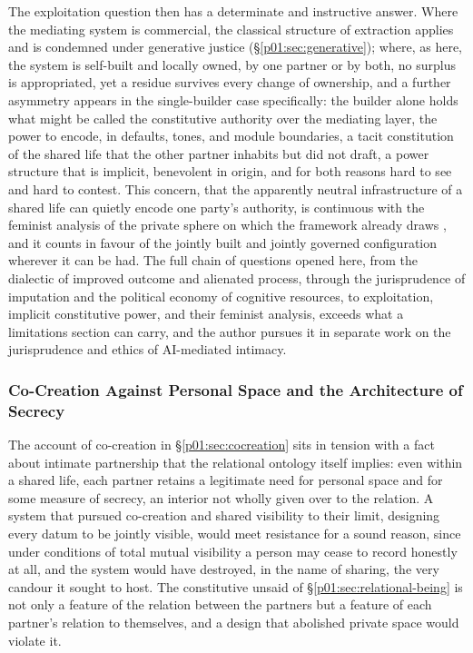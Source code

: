 \documentclass[11pt,a4paper]{article}
\begin{document}
The exploitation question then has a determinate and instructive answer. Where the mediating system is commercial, the classical structure of extraction applies and is condemned under generative justice (§\ref{p01:sec:generative}); where, as here, the system is self-built and locally owned, by one partner or by both, no surplus is appropriated, yet a residue survives every change of ownership, and a further asymmetry appears in the single-builder case specifically: the builder alone holds what might be called the constitutive authority over the mediating layer, the power to encode, in defaults, tones, and module boundaries, a tacit constitution of the shared life that the other partner inhabits but did not draft, a power structure that is implicit, benevolent in origin, and for both reasons hard to see and hard to contest. This concern, that the apparently neutral infrastructure of a shared life can quietly encode one party's authority, is continuous with the feminist analysis of the private sphere on which the framework already draws \parencite{gilligan1982voice, held2006ethics, tronto1993moral}, and it counts in favour of the jointly built and jointly governed configuration wherever it can be had. The full chain of questions opened here, from the dialectic of improved outcome and alienated process, through the jurisprudence of imputation and the political economy of cognitive resources, to exploitation, implicit constitutive power, and their feminist analysis, exceeds what a limitations section can carry, and the author pursues it in separate work on the jurisprudence and ethics of AI-mediated intimacy.

\subsubsection{Co-Creation Against Personal Space and the Architecture of Secrecy}

The account of co-creation in §\ref{p01:sec:cocreation} sits in tension with a fact about intimate partnership that the relational ontology itself implies: even within a shared life, each partner retains a legitimate need for personal space and for some measure of secrecy, an interior not wholly given over to the relation. A system that pursued co-creation and shared visibility to their limit, designing every datum to be jointly visible, would meet resistance for a sound reason, since under conditions of total mutual visibility a person may cease to record honestly at all, and the system would have destroyed, in the name of sharing, the very candour it sought to host. The constitutive unsaid of §\ref{p01:sec:relational-being} is not only a feature of the relation between the partners but a feature of each partner's relation to themselves, and a design that abolished private space would violate it.
\end{document}
